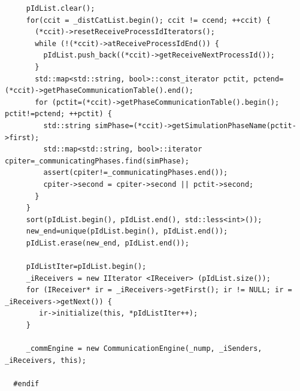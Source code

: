 \begin{verbatim}
     pIdList.clear();                                                                                           
     for(ccit = _distCatList.begin(); ccit != ccend; ++ccit) {                                                  
       (*ccit)->resetReceiveProcessIdIterators();                                                               
       while (!(*ccit)->atReceiveProcessIdEnd()) {                                                              
         pIdList.push_back((*ccit)->getReceiveNextProcessId());                                                 
       }                                                                                                        
       std::map<std::string, bool>::const_iterator pctit, pctend=(*ccit)->getPhaseCommunicationTable().end();   
       for (pctit=(*ccit)->getPhaseCommunicationTable().begin(); pctit!=pctend; ++pctit) {                      
         std::string simPhase=(*ccit)->getSimulationPhaseName(pctit->first);                                    
         std::map<std::string, bool>::iterator cpiter=_communicatingPhases.find(simPhase);                      
         assert(cpiter!=_communicatingPhases.end());                                                            
         cpiter->second = cpiter->second || pctit->second;                                                      
       }                                                                                                        
     }                                                                                                          
     sort(pIdList.begin(), pIdList.end(), std::less<int>());                                                    
     new_end=unique(pIdList.begin(), pIdList.end());                                                            
     pIdList.erase(new_end, pIdList.end());                                                                     
                                                                                                                
     pIdListIter=pIdList.begin();                                                                               
     _iReceivers = new IIterator <IReceiver> (pIdList.size());                                                  
     for (IReceiver* ir = _iReceivers->getFirst(); ir != NULL; ir = _iReceivers->getNext()) {                   
        ir->initialize(this, *pIdListIter++);                                                                   
     }                                                                                                          
                                                                                                                
     _commEngine = new CommunicationEngine(_nump, _iSenders, _iReceivers, this);                                
                                                                                                                
  #endif                                                                            
\end{verbatim}

